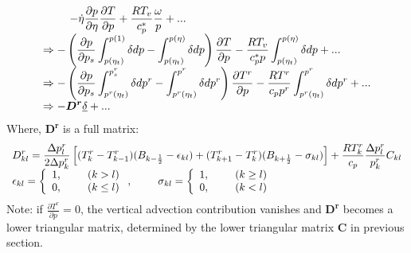 \documentclass[12pt,a4paper]{book}
\begin{document}
	\begin{equation}	
	\begin{array}{l}
	\displaystyle 
	\hspace{2 pc} -\dot{\eta} \frac{\partial p}{\partial \eta} \frac{\partial T}{\partial p} 
	+ \frac{R T_v}{c_p^*} \frac{\omega}{p} + ...\\
	\displaystyle 
	\Rightarrow -\left( \frac{\partial p}{\partial p_s}  \int_{p(\eta_t)}^{p(1)} \delta dp - \int_{p(\eta_t)}^{p(\eta)} \delta dp  \right) \frac{\partial T}{\partial p}
	- \frac{R T_v}{c_p^* p} \int_{p(\eta_t)}^{p(\eta)} \delta dp + ... \\
	\displaystyle 
	\Rightarrow -\left( \frac{\partial p}{\partial p_s}  \int_{p^r(\eta_t)}^{p^r_s} \delta dp^r - \int_{p^r(\eta_t)}^{p^r} \delta dp^r  \right) \frac{\partial T^r}{\partial p}
		- \frac{R T^r}{c_p p^r} \int_{p^r(\eta_t)}^{p^r} \delta dp^r + ... \\
	\displaystyle 
	\Rightarrow -\boldsymbol{D^r} \underline{\delta} + ...
	\end{array}	
	\end{equation}
Where, $\boldsymbol{D^r}$ is a full matrix:
	\begin{equation}
	\begin{array}{l}
	\displaystyle 
	D^r_{kl} = \frac{\Delta p^r_l}{2 \Delta p^r_k} \left[ (T^r_k - T^r_{k-1})(B_{k-\frac{1}{2}} 
	- \epsilon_{kl}) + (T^r_{k+1} - T^r_k)(B_{k+\frac{1}{2}} - \sigma_{kl}) \right]
	+ \frac{R T^r_k}{c_p} \frac{\Delta p^r_l}{p^r_k} C_{kl} \\
	\displaystyle 
	\epsilon_{kl} = \left\lbrace
	\begin{array}{l}
	1, \hspace{2 pc}  (k>l) \\
	0, \hspace{2 pc}  (k \leq l)
	\end{array} \right. 

	, \hspace{2 pc} \sigma_{kl} = \left\lbrace
	\begin{array}{l}
	1, \hspace{2 pc}  (k \geq l) \\
	0, \hspace{2 pc}  (k<l)
	\end{array} \right.
	
	\end{array} 
	\end{equation}
Note: if $\frac{\partial T^r}{\partial p} = 0$, the vertical advection contribution vanishes and $\boldsymbol{D^r}$ becomes a lower triangular matrix, determined by the lower triangular matrix $\boldsymbol{C}$ in previous section.
\end{document}
